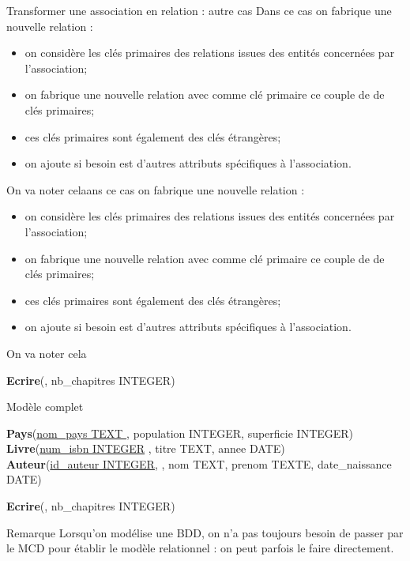 \documentclass[10pt]{nsibeamer}
\begin{document}
\begin{frame}{Transformer une association en relation : autre cas}
	Dans ce cas on fabrique une nouvelle relation :
	\begin{itemize}
		\item on considère les clés primaires des relations issues des entités concernées par l'association;
		\item on fabrique une \alert{nouvelle relation} avec comme clé primaire ce couple de de clés primaires;
		\item ces clés primaires sont également des \alert{clés étrangères};
		\item on ajoute si besoin est d'autres attributs spécifiques à l'association.
	\end{itemize}
	On va noter celaans ce cas on fabrique une nouvelle relation :
	\begin{itemize}
		\item on considère les clés primaires des relations issues des entités concernées par l'association;
		\item on fabrique une \alert{nouvelle relation} avec comme clé primaire ce couple de de clés primaires;
		\item ces clés primaires sont également des \alert{clés étrangères};
		\item on ajoute si besoin est d'autres attributs spécifiques à l'association.
	\end{itemize}
	On va noter cela

	\textbf{Ecrire}(\uline{}, nb\_chapitres INTEGER)\\
\end{frame}
\begin{frame}{Modèle complet}

	{\footnotesize
		\textbf{Pays}(\uline{nom\_pays TEXT }, population INTEGER, superficie INTEGER)\\

		\textbf{Livre}(\uline{num\_isbn INTEGER} , titre TEXT, annee DATE)\\

		{\scriptsize\textbf{Auteur}(\uline{id\_auteur INTEGER},  , nom TEXT, prenom TEXTE, date\_naissance DATE)\\}

		\textbf{Ecrire}(\uline{}, nb\_chapitres INTEGER)}

\end{frame}
\begin{frame}{Remarque}
	Lorsqu'on modélise une BDD, on n'a pas toujours besoin de passer par le MCD pour établir le modèle relationnel : on peut parfois le faire directement.
\end{frame}
\end{document}
